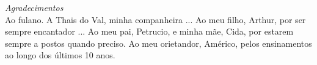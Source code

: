 \clearpage

\vspace*{0.75\textheight}

\begin{flushright}
\emph{Agradecimentos} \\

  Ao fulano.
  A Thais do Val, minha companheira ...
  Ao meu filho, Arthur, por ser sempre encantador ...
  Ao meu pai, Petrucio, e minha mãe, Cida, por estarem sempre a postos quando preciso. 
  Ao meu orietandor, Américo, pelos ensinamentos ao longo dos últimos 10 anos. 
\end{flushright}
